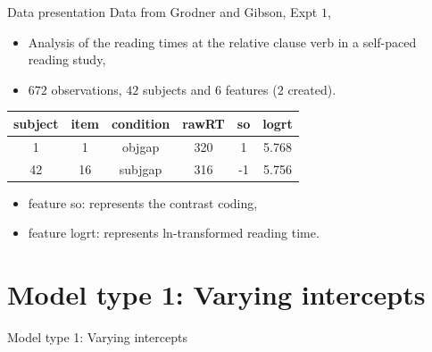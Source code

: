 \documentclass[unknownkeysallowed]{beamer}
\begin{document}
\begin{frame}{Data presentation}
Data from Grodner and Gibson, Expt $1$,
\begin{itemize}
    \item Analysis of the reading times at the relative clause verb in a self-paced reading study,
    \item $672$ observations, $42$ subjects and $6$ features ($2$ created).
\end{itemize}
\begin{center}
    \begin{tabular}{|c|c|c|c|c|c|}
    \hline
         subject & item & condition & rawRT & so & logrt  \\
         \hline \hline
         1 & 1 & objgap & 320 & 1 & 5.768\\
         42 & 16 & subjgap & 316 & -1 & 5.756\\
         \hline
    \end{tabular}
\end{center}
\begin{itemize}
    \item feature so: represents the contrast coding,
    \item feature logrt: represents ln-transformed reading time.
\end{itemize}
\end{frame}

\section{Model type 1: Varying intercepts}

\begin{frame}[plain]{}
    \begin{center}
        \LARGE Model type 1: Varying intercepts
    \end{center}
\end{frame}
\end{document}
